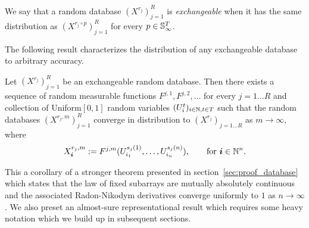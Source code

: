 
\begin{definition}
We say that a random database $(X^{r_j})_{j=1}^R$ is \emph{exchangeable} when it has the same distribution as $(X^{r_j\circ p})_{j=1}^R$ for every $p \in \mathbb{S}_{\infty}^T$.
\end{definition}




The following result characterizes the distribution of any exchangeable database to arbitrary accuracy.

\begin{cor}
  \label{cor:simple-database}
   Let $(X^{r_j})_{j=1}^R$ be an exchangeable random database.
   Then there exists a sequence of random measurable functions $F^{j,1}, F^{j,2}, \dotsc$ for 
   every $j=1\ldots R$ and collection of \iid Uniform$[0,1]$ random variables $(U^t_i)_{i\in\mathbb{N},t \in T}$ such that 
   the random databases $(X^{r_j,m})_{j=1}^R$
    converge in distribution to $(X^{r_j})_{j=1\ldots R}$ as $m \to \infty$, where   
   \[
     X^{r_j,m}_{\bm{i}} := F^{j,m}(U^{s_j(1)}_{i_1},\dotsc,U^{s_j(n)}_{i_n}), \qquad \text{for } \bm{i} \in \mathbb{N}^n.
   \]
\end{cor}

This a corollary of a stronger theorem presented in section~\ref{sec:proof_database} which states that the law of fixed subarrays are mutually absolutely continuous and the associated Radon-Nikodym derivatives converge uniformly to $1$ as $n \to \infty$.
We also preset an almost-sure representational result which requires some heavy notation which we build up in subsequent sections.


